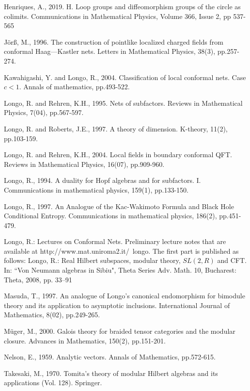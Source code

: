\documentclass[12pt,a4paper]{article}
\theoremstyle{definition}
\theoremstyle{plain}
\numberwithin{equation}{section}
\begin{document}
\begin{thebibliography}{99999}
Henriques, A., 2019. H. Loop groups and diffeomorphism groups of the circle as colimits. Communications in Mathematical Physics,  Volume 366, Issue 2, pp 537-565

J\"or\ss, M., 1996. The construction of pointlike localized charged fields from conformal Haag—Kastler nets. Letters in Mathematical Physics, 38(3), pp.257-274.

Kawahigashi, Y. and Longo, R., 2004. Classification of local conformal nets. Case $c<1$. Annals of mathematics, pp.493-522.


Longo, R. and Rehren, K.H., 1995. Nets of subfactors. Reviews in Mathematical Physics, 7(04), pp.567-597.


Longo, R. and Roberts, J.E., 1997. A theory of dimension. K-theory, 11(2), pp.103-159.

Longo, R. and Rehren, K.H., 2004. Local fields in boundary conformal QFT. Reviews in Mathematical Physics, 16(07), pp.909-960.


Longo, R., 1994. A duality for Hopf algebras and for subfactors. I. Communications in mathematical physics, 159(1), pp.133-150.

Longo, R., 1997. An Analogue of the Kac-Wakimoto Formula and Black Hole Conditional Entropy. Communications in mathematical physics, 186(2), pp.451-479.

Longo, R.: Lectures on Conformal Nets. Preliminary lecture notes that are available at http://www.mat.uniroma2.it/~longo. The first part is published as follows: Longo, R.: Real Hilbert subspaces, modular theory, $SL(2, R)$ and CFT. In: ``Von Neumann algebras in Sibiu", Theta Series Adv. Math. 10, Bucharest: Theta, 2008, pp. 33–91

Masuda, T., 1997. An analogue of Longo's canonical endomorphism for bimodule theory and its application to asymptotic inclusions. International Journal of Mathematics, 8(02), pp.249-265.


M\"uger, M., 2000. Galois theory for braided tensor categories and the modular closure. Advances in Mathematics, 150(2), pp.151-201.



Nelson, E., 1959. Analytic vectors. Annals of Mathematics, pp.572-615.


Takesaki, M., 1970. Tomita's theory of modular Hilbert algebras and its applications (Vol. 128). Springer.


\end{thebibliography}
\end{document}
